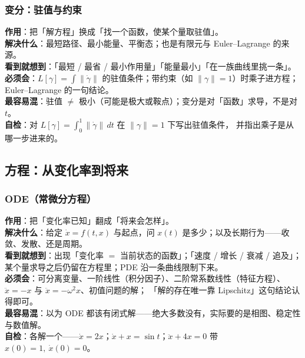 \subsubsection*{变分：驻值与约束}
\textbf{作用}：把「解方程」换成「找一个函数，使某个量取驻值」。\\
\textbf{解决什么}：最短路径、最小能量、平衡态；也是有限元与 Euler--Lagrange 的来源。\\
\textbf{看到就想到}：「最短 / 最省 / 最小作用量」「能量最小」「在一族曲线里挑一条」。\\
\textbf{必须会}：$L[\gamma]=\int\lVert\dot\gamma\rVert$ 的驻值条件；带约束（如 $\lVert\gamma\rVert=1$）时乘子进方程；Euler--Lagrange 的一句结论。\\
\textbf{最容易混}：驻值 $\ne$ 极小（可能是极大或鞍点）；变分是对「函数」求导，不是对 $t$。\\
\textbf{自检}：对 $L[\gamma]=\int_0^1\lVert\dot\gamma\rVert\,dt$ 在 $\lVert\gamma\rVert=1$ 下写出驻值条件，
并指出乘子是从哪一步进来的。

\subsection{方程：从变化率到将来}
\label{app:ode}

\subsubsection*{ODE（常微分方程）}
\textbf{作用}：把「变化率已知」翻成「将来会怎样」。\\
\textbf{解决什么}：给定 $\dot x=f(t,x)$ 与起点，问 $x(t)$ 是多少；以及长期行为——收敛、发散、还是周期。\\
\textbf{看到就想到}：出现「变化率 $=$ 当前状态的函数」；「速度 / 增长 / 衰减 / 追及」；
某个量求导之后仍留在方程里；PDE 沿一条曲线限制下来。\\
\textbf{必须会}：可分离变量、一阶线性（积分因子）、二阶常系数线性（特征方程）、
$\ddot x=-x$ 与 $\ddot x=-\omega^{2}x$、初值问题的解；
「解的存在唯一靠 Lipschitz」这句结论认得即可。\\
\textbf{最容易混}：以为 ODE 都该有闭式解——绝大多数没有，实际要的是相图、稳定性与数值解。\\
\textbf{自检}：各解一个——$\dot x=2x$；$\dot x+x=\sin t$；$\ddot x+4x=0$ 带 $x(0)=1,\ \dot x(0)=0$。

